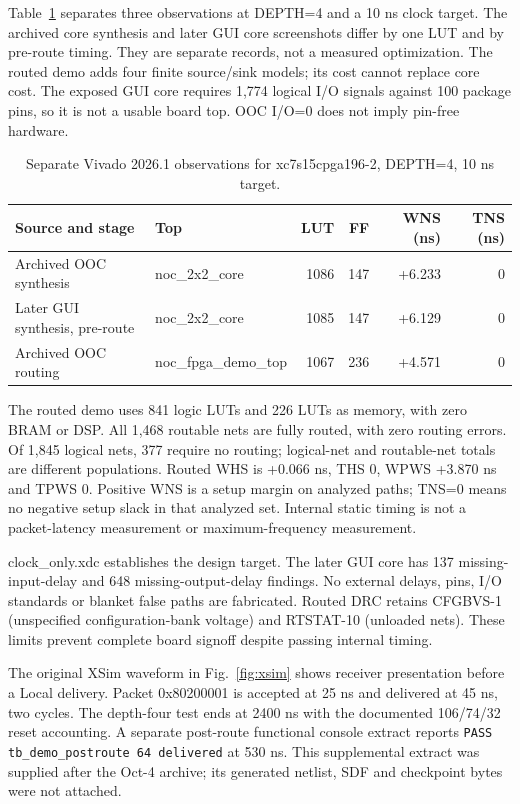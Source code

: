 \documentclass[conference,a4paper]{IEEEtran}
\begin{document}
Table~\ref{tab:fpga} separates three observations at DEPTH=4 and a 10 ns clock target. The archived core synthesis and later GUI core screenshots differ by one LUT and by pre-route timing. They are separate records, not a measured optimization. The routed demo adds four finite source/sink models; its cost cannot replace core cost. The exposed GUI core requires 1,774 logical I/O signals against 100 package pins, so it is not a usable board top. OOC I/O=0 does not imply pin-free hardware.
\begin{table}[t]
\caption{Separate Vivado 2026.1 observations for xc7s15cpga196-2, DEPTH=4, 10 ns target.}
\label{tab:fpga}\centering
\begin{tabular}{llrrrr}\toprule
Source and stage & Top & LUT & FF & WNS (ns) & TNS (ns) \\\midrule
Archived OOC synthesis & noc\_2x2\_core & 1086 & 147 & +6.233 & 0 \\
Later GUI synthesis, pre-route & noc\_2x2\_core & 1085 & 147 & +6.129 & 0 \\
Archived OOC routing & noc\_fpga\_demo\_top & 1067 & 236 & +4.571 & 0 \\\bottomrule
\end{tabular}
\end{table}

The routed demo uses 841 logic LUTs and 226 LUTs as memory, with zero BRAM or DSP. All 1,468 routable nets are fully routed, with zero routing errors. Of 1,845 logical nets, 377 require no routing; logical-net and routable-net totals are different populations. Routed WHS is +0.066 ns, THS 0, WPWS +3.870 ns and TPWS 0. Positive WNS is a setup margin on analyzed paths; TNS=0 means no negative setup slack in that analyzed set. Internal static timing is not a packet-latency measurement or maximum-frequency measurement.

clock\_only.xdc establishes the design target. The later GUI core has 137 missing-input-delay and 648 missing-output-delay findings. No external delays, pins, I/O standards or blanket false paths are fabricated. Routed DRC retains CFGBVS-1 (unspecified configuration-bank voltage) and RTSTAT-10 (unloaded nets). These limits prevent complete board signoff despite passing internal timing.

The original XSim waveform in Fig.~\ref{fig:xsim} shows receiver presentation before a Local delivery. Packet 0x80200001 is accepted at 25 ns and delivered at 45 ns, two cycles. The depth-four test ends at 2400 ns with the documented 106/74/32 reset accounting. A separate post-route functional console extract reports \texttt{PASS tb\_demo\_postroute 64 delivered} at 530 ns. This supplemental extract was supplied after the Oct-4 archive; its generated netlist, SDF and checkpoint bytes were not attached.
\end{document}
